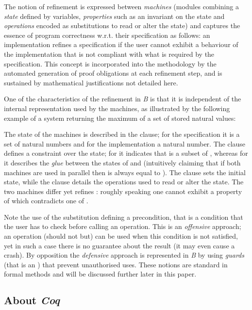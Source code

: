 \documentclass[conference]{IEEEtran}
\begin{document}
The notion of refinement is expressed between \emph{machines} (modules combining a
\emph{state} defined by variables, \emph{properties} such as an invariant on the state and
\emph{operations} encoded as substitutions to read or alter the state) and captures the
essence of program correctness w.r.t. their specification as follows: an implementation
refines a specification if the user cannot exhibit a behaviour of the implementation that is
not compliant with what is required by the specification. This concept is incorporated into
the methodology by the automated generation of proof obligations at each refinement step, and
is sustained by mathematical justifications not detailed here.

One of the characteristics of the refinement in \emph{B} is that it is independent of the 
internal representation used by the machines, as illustrated by the following example of a
system returning the maximum of a set of stored natural values:

The state of the machines is described in the {\small} clause; for the
specification {\small} it is a set of natural numbers and for the implementation
{\small} a natural number. The {\small} clause defines a constraint over
the state; for {\small} it indicates that {\small} is a subset of {\small},
whereas for {\small} it describes the \emph{glue} between the states of {\small} and
{\small} (intuitively claiming that if both machines are used in parallel then
{\small} is always equal to {\small}). The {\small}
clause sets the initial state, while the {\small} clause details the
operations used to read or alter the state. The two machines differ yet {\small} refines
{\small}: roughly speaking one cannot exhibit a property of {\small} which
contradicts one of {\small}.

Note the use of the {\small} substitution defining a precondition, that is a
condition that the user has to check before calling an operation. This is an \emph{offensive}
approach; an operation (should not but) can be used when this condition is not satisfied, yet
in such a case there is no guarantee about the result (it may even cause a crash). By
opposition the \emph{defensive} approach is represented in \emph{B} by using \emph{guards}
(that is an {\small}) that prevent unauthorised uses. These notions are standard in
formal methods and will be discussed further later in this paper.

\subsection{About \emph{Coq}}\label{Coq}
\end{document}
